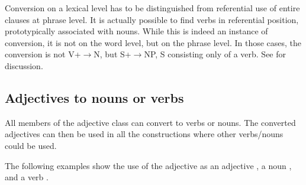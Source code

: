 Conversion on a lexical level has to be distinguished from referential use of entire clauses at phrase level. It is actually possible to find verbs in referential position, prototypically associated with nouns. While this is indeed an instance of conversion, it is not on the word level, but on the phrase level. In those cases, the conversion is not  V+\zero$\to$N, but S+\zero$\to$NP, S consisting only of a verb. See  for discussion.

\subsection{Adjectives to nouns or verbs}\label{sec:wofo:Adjectivestonounsorverbs}
All members of the adjective class can convert to verbs or nouns. The converted adjectives can then be used in all the constructions where other verbs/nouns could be used.


The following examples show the use of the adjective  as an adjective , a noun , and a verb .









